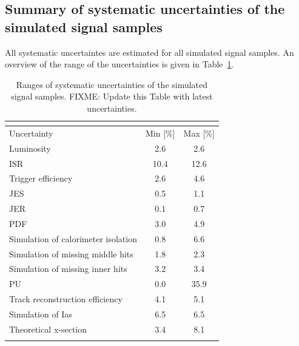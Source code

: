 \subsection*{Summary of systematic uncertainties of the simulated signal samples}
All systematic uncertaintes are estimated for all simulated signal samples.
An overview of the range of the uncertainties is given in Table~\ref{tab:SignalSysUnc}.

\renewcommand{\arraystretch}{1.5}
\begin{table}[!h] 
\centering
\caption{Ranges of systematic uncertainties of the simulated signal samples. FIXME: Update this Table with latest uncertainties.}
\label{tab:SignalSysUnc}
\begin{tabular}{|l|c|c|}  
\multicolumn{3}{c}{} \\
\toprule
Uncertainty                             &Min [\%]           &Max [\%]           \\ 
\midrule
Luminosity                              &2.6                &2.6                \\ 
ISR                                     &10.4               &12.6               \\ 
Trigger efficiency                      &2.6                &4.6                \\ 
JES                                     &0.5                &1.1                \\ 
JER                                     &0.1                &0.7                \\ 
PDF                                     &3.0                &4.9                \\ 
Simulation of calorimeter isolation     &0.8                &6.6                \\ 
Simulation of missing middle hits       &1.8                &2.3                \\ 
Simulation of missing inner hits        &3.2                &3.4                \\ 
PU                                      &0.0                &35.9               \\ 
Track reconstruction efficiency         &4.1                &5.1                \\ 
Simulation of Ias                       &6.5                &6.5                \\ 
Theoretical x-section                   &3.4                &8.1                \\ 
\bottomrule
\multicolumn{3}{c}{} \\
\end{tabular}  
\end{table} 

